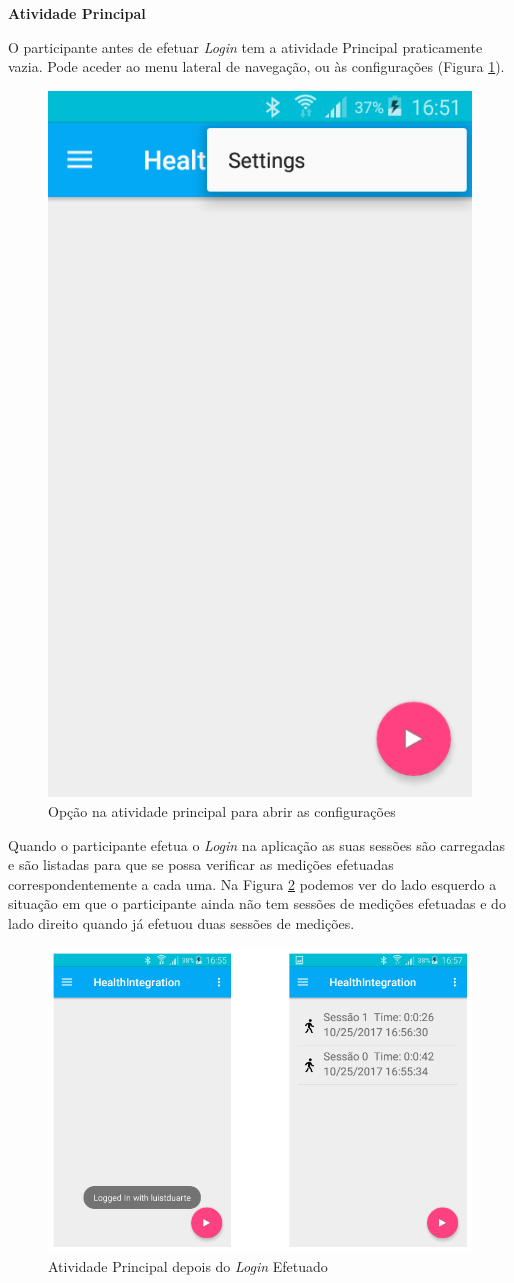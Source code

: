 \par
\textbf{Atividade Principal}
\par
O participante antes de efetuar \textit{Login} tem a atividade Principal praticamente vazia. Pode aceder ao menu lateral de navegação, ou às configurações (Figura \ref{f:seesettings}).
\begin{figure}[H]
\centering
\includegraphics[height=0.3\textwidth]{imgs/seesettings.png}
\caption[Opção na atividade principal para abrir as configurações]{Opção na atividade principal para abrir as configurações}
\label{f:seesettings}
\end{figure}
Quando o participante efetua o \textit{Login} na aplicação as suas sessões são carregadas e são listadas para que se possa verificar as medições efetuadas correspondentemente a cada uma. Na Figura \ref{f:afterlogin} podemos ver do lado esquerdo a situação em que o participante ainda não tem sessões de medições efetuadas e do lado direito quando já efetuou duas sessões de medições.

\begin{figure}[H]
\centering
\includegraphics[height=0.4\textwidth]{imgs/afterlogin.png}
\caption[Atividade Principal depois do \textit{Login} Efetuado]{Atividade Principal depois do \textit{Login} Efetuado}
\label{f:afterlogin}
\end{figure}

